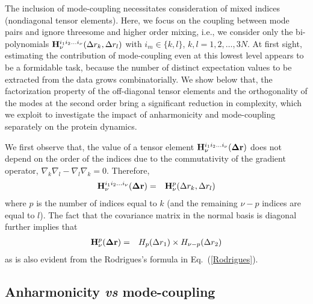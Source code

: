\documentclass[12pt,article]{iopart}
\begin{document}
The inclusion of mode-coupling necessitates consideration of mixed
indices (nondiagonal tensor elements). Here, we focus on the coupling
between mode pairs and ignore threesome and higher order mixing, i.e.,
we consider only the bi-polynomials ${\bf H}^{i_1i_2\dots
i_\nu}_\nu(\Delta r_k,\Delta r_l)$ with $i_m \in \{k,l\}$,
$k,l=1,2,\dots,3N$. At first sight, estimating the contribution of
mode-coupling even at this lowest level appears to be a formidable
task, because the number of distinct expectation values to be
extracted from the data grows combinatorially. We show below that, the
factorization property of the off-diagonal tensor elements and the
orthogonality of the modes at the second order bring a significant
reduction in complexity, which we exploit to investigate the impact of
anharmonicity and mode-coupling separately on the protein dynamics.

We first observe that, the value of a tensor element ${\bf
H}^{i_1i_2\dots i_\nu}_\nu({\bf \Delta r})$ does not depend on the
order of the indices due to the commutativity of the gradient
operator, $\nabla_k\nabla_l - \nabla_l\nabla_k=0$. Therefore,
\begin{eqnarray}
{\bf H}^{i_1i_2\dots i_\nu}_\nu({\bf \Delta r}) &=& {\bf H}^p_\nu(\Delta r_k,\Delta r_l) \nonumber
\end{eqnarray}
where $p$ is the number of indices equal to $k$ (and the remaining
$\nu-p$ indices are equal to $l$). The fact that the covariance matrix
in the normal basis is diagonal further implies that
\begin{eqnarray}
\label{factorization}
{\bf H}^p_\nu({\bf \Delta r}) &=& H_p(\Delta r_1)\times H_{\nu-p}(\Delta r_2)
\end{eqnarray}
as is also evident from the Rodrigues's formula in Eq.~(\ref{Rodrigues}).

\subsection{Anharmonicity {\it vs} mode-coupling}
\end{document}
